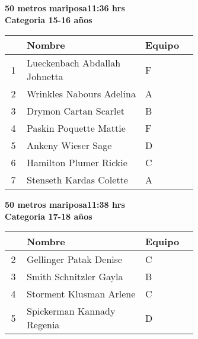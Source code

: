 \begin{minipage}{0.95\linewidth}\vspace{0.5cm} 
\begin{flushleft}
\textbf{
\hspace{-0.15cm}50 metros mariposa\hspace{1.5cm}11:36 hrs \\Categoria 15-16 años}\vspace{-0.2cm} 
\end{flushleft}
\begin{tabular}{cp{0.63\linewidth}l}
\hline
& \textbf{Nombre} & \textbf{Equipo} \\ \hline
1 & Lueckenbach Abdallah Johnetta & F \\ 
2 & Wrinkles Nabours Adelina & A \\ 
3 & Drymon Cartan Scarlet & B \\ 
4 & Paskin Poquette Mattie & F \\ 
5 & Ankeny Wieser Sage & D \\ 
6 & Hamilton Plumer Rickie & C \\ 
7 & Stenseth Kardas Colette & A \\ 
\end{tabular}
\end{minipage}
\begin{minipage}{0.95\linewidth}\vspace{0.5cm} 
\begin{flushleft}
\textbf{
\hspace{-0.15cm}50 metros mariposa\hspace{1.5cm}11:38 hrs \\Categoria 17-18 años}\vspace{-0.2cm} 
\end{flushleft}
\begin{tabular}{cp{0.63\linewidth}l}
\hline
& \textbf{Nombre} & \textbf{Equipo} \\ \hline
2 & Gellinger Patak Denise & C \\ 
3 & Smith Schnitzler Gayla & B \\ 
4 & Storment Klusman Arlene & C \\ 
5 & Spickerman Kannady Regenia & D \\ 
\end{tabular}
\end{minipage}

